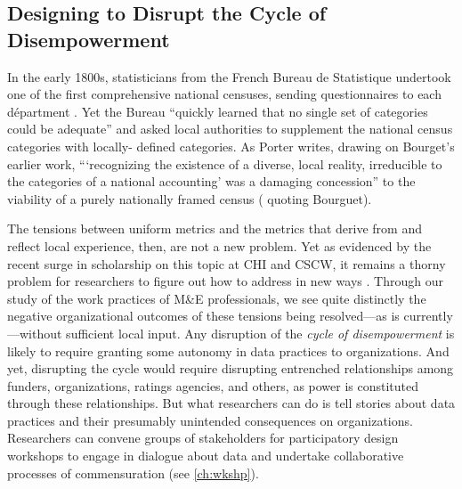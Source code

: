 \subsection{Designing to Disrupt the Cycle of Disempowerment}

In the early 1800s, statisticians from the French Bureau de Statistique undertook one of the first comprehensive national censuses, sending questionnaires to each départment \citep{Porter1995Trust}. Yet the Bureau “quickly learned that no single set of categories could be adequate” and asked local authorities to supplement the national census categories with locally- defined categories. As Porter writes, drawing on Bourget’s earlier work, “‘recognizing the existence of a diverse, local reality, irreducible to the categories of a national accounting’ was a damaging concession” to the viability of a purely nationally framed census (\cite{Porter1995Trust} quoting Bourguet).

The tensions between uniform metrics and the metrics that derive from and reflect local experience, then, are not a new problem. Yet as evidenced by the recent surge in scholarship on this topic at CHI and CSCW, it remains a thorny problem for researchers to figure out how to address in new ways \citep{Bowker2000Sorting,Pine2015Politics,Voida2017Currencies,Verma2016DrillDown}. Through our study of the work practices of M\&E professionals, we see quite distinctly the negative organizational outcomes of these tensions being resolved---as is currently—without sufficient local input. Any disruption of the \textit{cycle of disempowerment} is likely to require granting some autonomy in data practices to organizations. And yet, disrupting the cycle would require disrupting entrenched relationships among funders, organizations, ratings agencies, and others, as power is constituted through these relationships. But what researchers can do is tell stories about data practices and their presumably unintended consequences on organizations. Researchers can convene groups of stakeholders for participatory design workshops to engage in dialogue about data and undertake collaborative processes of commensuration (see \autoref{ch:wkshp}).

